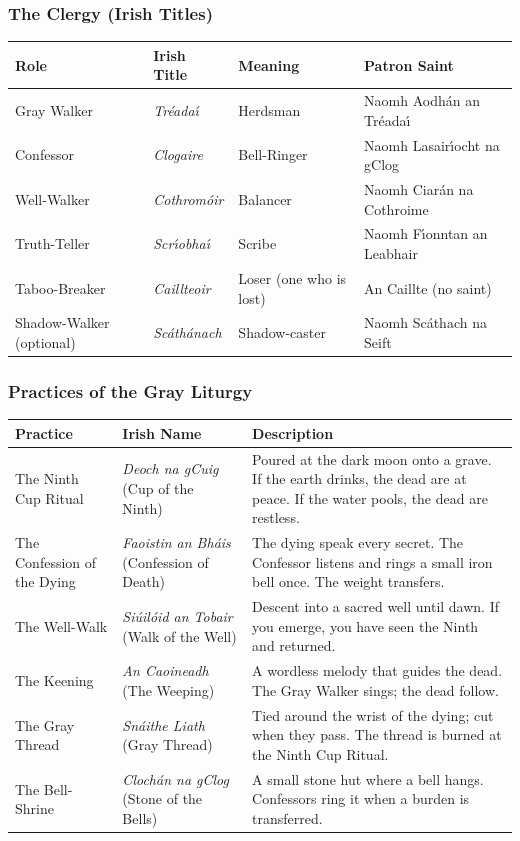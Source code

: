 \subsubsection*{The Clergy (Irish Titles)}

\begin{longtable}{|p{}|p{}|p{}|p{}|}
\hline
\textbf{Role} & \textbf{Irish Title} & \textbf{Meaning} & \textbf{Patron Saint} \\
\hline
Gray Walker & \textit{Tr\'eada\'{\i}} & Herdsman & Naomh Aodh\'an an Tr\'eada\'{\i} \\
\hline
Confessor & \textit{Clogaire} & Bell-Ringer & Naomh Lasair\'{\i}ocht na gClog \\
\hline
Well-Walker & \textit{Cothrom\'oir} & Balancer & Naomh Ciar\'an na Cothroime \\
\hline
Truth-Teller & \textit{Scr\'{\i}obha\'{\i}} & Scribe & Naomh F\'{\i}onntan an Leabhair \\
\hline
Taboo-Breaker & \textit{Caillteoir} & Loser (one who is lost) & An Caillte (no saint) \\
\hline
Shadow-Walker (optional) & \textit{Sc\'ath\'anach} & Shadow-caster & Naomh Sc\'athach na Seift \\
\hline
\end{longtable}

\subsubsection*{Practices of the Gray Liturgy}

\begin{longtable}{|p{}|p{}|p{}|}
\hline
\textbf{Practice} & \textbf{Irish Name} & \textbf{Description} \\
\hline
The Ninth Cup Ritual & \textit{Deoch na gCuig} (Cup of the Ninth) & Poured at the dark moon onto a grave. If the earth drinks, the dead are at peace. If the water pools, the dead are restless. \\
\hline
The Confession of the Dying & \textit{Faoistin an Bh\'ais} (Confession of Death) & The dying speak every secret. The Confessor listens and rings a small iron bell once. The weight transfers. \\
\hline
The Well-Walk & \textit{Si\'uil\'oid an Tobair} (Walk of the Well) & Descent into a sacred well until dawn. If you emerge, you have seen the Ninth and returned. \\
\hline
The Keening & \textit{An Caoineadh} (The Weeping) & A wordless melody that guides the dead. The Gray Walker sings; the dead follow. \\
\hline
The Gray Thread & \textit{Sn\'aithe Liath} (Gray Thread) & Tied around the wrist of the dying; cut when they pass. The thread is burned at the Ninth Cup Ritual. \\
\hline
The Bell-Shrine & \textit{Cloch\'an na gClog} (Stone of the Bells) & A small stone hut where a bell hangs. Confessors ring it when a burden is transferred. \\
\hline
\end{longtable}

